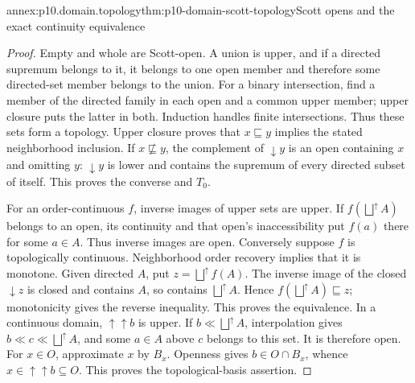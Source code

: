 \begin{annexitem}{annex:p10.domain.topology}{thm:p10-domain-scott-topology}{Scott opens and the exact continuity equivalence}
\begin{proof}
Empty and whole are Scott-open. A union is upper, and if a directed
supremum belongs to it, it belongs to one open member and therefore
some directed-set member belongs to the union. For a binary intersection,
find a member of the directed family in each open and a common upper
member; upper closure puts the latter in both. Induction handles finite
intersections. Thus these sets form a topology.
Upper closure proves that \(x\sqsubseteq y\) implies the stated
neighborhood inclusion. If \(x\not\sqsubseteq y\), the complement
of \(\downarrow y\) is an open containing \(x\) and omitting \(y\):
\(\downarrow y\) is lower and contains the supremum of every
directed subset of itself. This proves the converse and \(T_0\).

For an order-continuous \(f\), inverse images of upper sets are
upper. If \(f(\bigsqcup^{\uparrow}A)\) belongs to an open, its
continuity and that open's inaccessibility put \(f(a)\) there for
some \(a\in A\). Thus inverse images are open.
Conversely suppose \(f\) is topologically continuous. Neighborhood
order recovery implies that it is monotone. Given directed \(A\),
put \(z=\bigsqcup^{\uparrow}f(A)\). The inverse image of the
closed \(\downarrow z\) is closed and contains \(A\), so contains
\(\bigsqcup^{\uparrow}A\). Hence
\(f(\bigsqcup^{\uparrow}A)\sqsubseteq z\); monotonicity gives
the reverse inequality. This proves the equivalence.
In a continuous domain, \(\mathord{\uparrow\!\uparrow}b\) is
upper. If \(b\ll\bigsqcup^{\uparrow}A\), interpolation gives
\(b\ll c\ll\bigsqcup^{\uparrow}A\), and some \(a\in A\)
above \(c\) belongs to this set. It is therefore open. For
\(x\in O\), approximate \(x\) by \(B_x\). Openness gives
\(b\in O\cap B_x\), whence
\(x\in\mathord{\uparrow\!\uparrow}b\subseteq O\).
This proves the topological-basis assertion.
\end{proof}
\end{annexitem}

